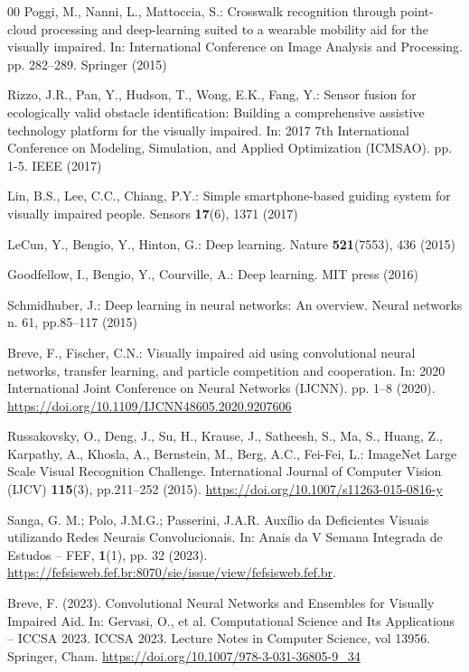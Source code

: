 \documentclass[preprint,12pt]{elsarticle}
\begin{document}
\begin{thebibliography}{00}
Poggi, M., Nanni, L., Mattoccia, S.: Crosswalk recognition through point-cloud processing and deep-learning suited to a wearable mobility aid for the visually impaired. In: International Conference on Image Analysis and Processing. pp. 282--289. Springer (2015)

Rizzo, J.R., Pan, Y., Hudson, T., Wong, E.K., Fang, Y.: Sensor fusion for ecologically valid obstacle identification: Building a comprehensive assistive technology platform for the visually impaired. In: 2017 7th International Conference on Modeling, Simulation, and Applied Optimization (ICMSAO). pp. 1-5. IEEE (2017)

Lin, B.S., Lee, C.C., Chiang, P.Y.: Simple smartphone-based guiding system for visually impaired people. Sensors \textbf{17}(6), 1371 (2017)

LeCun, Y., Bengio, Y., Hinton, G.: Deep learning. Nature \textbf{521}(7553), 436 (2015)

Goodfellow, I., Bengio, Y., Courville, A.: Deep learning. MIT press (2016)

Schmidhuber, J.: Deep learning in neural networks: An overview. Neural networks n. 61, pp.85--117 (2015)

Breve, F., Fischer, C.N.: Visually impaired aid using convolutional neural networks, transfer learning, and particle competition and cooperation. In: 2020 International Joint Conference on Neural Networks (IJCNN). pp. 1--8 (2020). \url{https://doi.org/10.1109/IJCNN48605.2020.9207606}

Russakovsky, O., Deng, J., Su, H., Krause, J., Satheesh, S., Ma, S., Huang, Z., Karpathy, A., Khosla, A., Bernstein, M., Berg, A.C., Fei-Fei, L.: ImageNet Large Scale Visual Recognition Challenge. International Journal of Computer Vision (IJCV) \textbf{115}(3), pp.211--252 (2015). \url{https://doi.org/10.1007/s11263-015-0816-y}

Sanga, G. M.; Polo, J.M.G.; Passerini, J.A.R. Auxílio da Deficientes Visuais utilizando Redes Neurais Convolucionais. In: Anais da V Semana Integrada de Estudos – FEF, \textbf{1}(1), pp. 32 (2023). \url{https://fefsisweb.fef.br:8070/sie/issue/view/fefsisweb.fef.br}.

Breve, F. (2023). Convolutional Neural Networks and Ensembles for Visually Impaired Aid. In: Gervasi, O., et al. Computational Science and Its Applications – ICCSA 2023. ICCSA 2023. Lecture Notes in Computer Science, vol 13956. Springer, Cham. \url{https://doi.org/10.1007/978-3-031-36805-9\_34}


\end{thebibliography}
\end{document}
